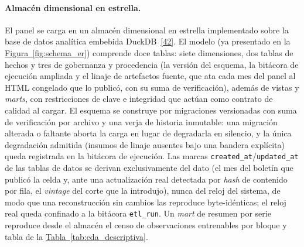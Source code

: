\documentclass[12pt,letterpaper]{report}
\newcommand{\cita}[1]{\hyperref[bib:#1]{[#1]}}
\begin{document}
\paragraph{Almac\'en dimensional en estrella.} El panel se carga en un almac\'en dimensional en
estrella implementado sobre la base de datos anal\'itica embebida DuckDB~\cita{42}. El modelo (ya
presentado en la \hyperref[fig:schema_er]{Figura~\ref*{fig:schema_er}}) comprende doce tablas: siete dimensiones, dos tablas
de hechos y tres de gobernanza y procedencia (la versi\'on del esquema, la bit\'acora de
ejecuci\'on ampliada y el linaje de artefactos fuente, que ata cada mes del panel al HTML
congelado que lo public\'o, con su suma de verificaci\'on), adem\'as de vistas y \textit{marts},
con restricciones de clave e integridad que act\'uan como contrato de calidad al cargar. El
esquema se construye por migraciones versionadas con suma de verificaci\'on por archivo y una
verja de historia inmutable: una migraci\'on alterada o faltante aborta la carga en lugar de
degradarla en silencio, y la \'unica degradaci\'on admitida (insumos de linaje ausentes bajo una
bandera expl\'icita) queda registrada en la bit\'acora de ejecuci\'on. Las marcas
\texttt{created\_at}/\texttt{updated\_at} de las tablas de datos se derivan exclusivamente del
dato (el mes del bolet\'in que public\'o la celda y, ante una actualizaci\'on real detectada por
\textit{hash} de contenido por fila, el \textit{vintage} del corte que la introdujo), nunca del
reloj del sistema, de modo que una reconstrucci\'on sin cambios las reproduce byte-id\'enticas; el
reloj real queda confinado a la bit\'acora \texttt{etl\_run}. Un \textit{mart} de resumen por serie
reproduce desde el almacén el censo de observaciones entrenables por bloque y tabla de la
\hyperref[tab:eda_descriptiva]{Tabla~\ref*{tab:eda_descriptiva}}.
\end{document}
